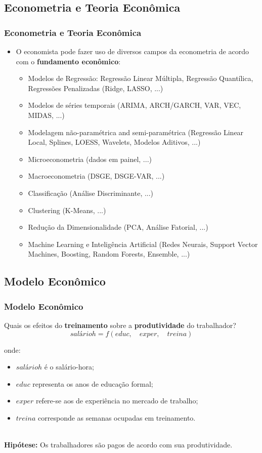 \documentclass[10pt,xcolor=table]{beamer}
\begin{document}
\subsection{Econometria e Teoria Econômica}
\begin{frame}\frametitle{Econometria e Teoria Econômica}
  \begin{itemize}
    \item O economista pode fazer uso de diversos campos da econometria de acordo com o \textbf{fundamento econômico}:
    \begin{itemize}
      \item Modelos de Regressão: Regressão Linear Múltipla, Regressão Quantílica, Regressões Penalizadas (Ridge, LASSO, ...)
      \item Modelos de séries temporais (ARIMA, ARCH/GARCH, VAR, VEC, MIDAS, ...)
      \item Modelagem não-paramétrica and semi-paramétrica (Regressão Linear Local, Splines, LOESS, Wavelets, Modelos Aditivos, ...)
      \item Microeconometria (dados em painel, ...)
      \item Macroeconometria (DSGE, DSGE-VAR, ...)
      \item Classificação (Análise Discriminante, ...)
      \item Clustering (K-Means, ...)
      \item Redução da Dimensionalidade (PCA, Análise Fatorial, ...)
      \item Machine Learning e Inteligência Artificial (Redes Neurais, Support Vector Machines, Boosting, Random Forests, Ensemble, ...)
    \end{itemize}
 \end{itemize}
\end{frame}



\subsection{Modelo Econômico}
\begin{frame}\frametitle{Modelo Econômico}
Quais os efeitos do \textbf{treinamento} sobre a \textbf{produtividade} do trabalhador?
\begin{equation}
salárioh = f\left( educ,\quad exper,\quad treina \right)
\end{equation}

onde: 
  \begin{itemize}
    \item $salárioh$ é o salário-hora;
    \item $educ$ representa os anos de educação formal;
    \item $exper$ refere-se aos de experiência no mercado de trabalho;
    \item $treina$ corresponde as semanas ocupadas em treinamento.\\~\\
  \end{itemize}

\textbf{Hipótese:} Os trabalhadores são pagos de acordo com sua produtividade.
\end{frame}
\end{document}
